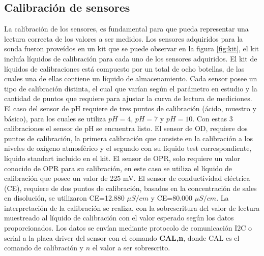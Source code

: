 \subsection{Calibración de sensores}
La calibraci\'on de los sensores, es fundamental para que pueda representar una lectura correcta de los valores a ser medidos. 
Los sensores adquiridos para la sonda fueron prove\'idos en un kit que se puede observar en la figura \ref{fig:kit}, el kit inclu\'ia l\'iquidos de calibraci\'on para cada uno de los sensores adquiridos. 
El kit de l\'iquidos de calibraciones est\'a compuesto por un total de ocho botellas, de las cuales una de ellas contiene un l\'iquido de almacenamiento. 
Cada sensor posee un tipo de calibraci\'on distinta, el cual que varían seg\'un el parámetro en estudio y la cantidad de puntos que requiere para ajustar la curva de lectura de mediciones.
El caso del sensor de pH requiere de tres puntos de calibración (ácido, muestro y básico), para los cuales se utiliza $pH=4$, $pH=7$ y $pH=10$.
Con estas 3 calibraciones el sensor de pH se encuentra listo.
El sensor de OD, requiere dos puntos de calibraci\'on, la primera calibraci\'on que consiste en la calibraci\'on a los niveles de ox\'igeno atmosf\'erico y el segundo con su l\'iquido test correspondiente, líquido standart incluido en el kit.
El sensor de OPR, solo requiere un valor conocido de OPR para su calibraci\'on, en este caso se utiliza el l\'iquido de calibraci\'on que posee un valor de 225 mV.
El sensor de conductividad el\'ectrica (CE), requiere de dos puntos de calibraci\'on, basados en la concentración de sales en disolución, se utilizaron CE=12.880 $\mu S/cm$ y CE=80.000 $\mu S/cm$.
La interpretación de la calibraci\'on se realiza, con la sobrescritura del valor de lectura muestreado al l\'iquido de calibraci\'on con el valor esperado seg\'un los datos proporcionados. 
Los datos se envían mediante protocolo de comunicaci\'on I2C o serial a la placa driver del sensor con el comando \textbf{CAL,n}, donde CAL es el comando de calibraci\'on y $n$ el valor a ser sobrescrito.

